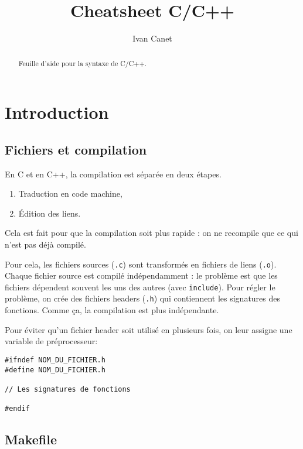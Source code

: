 \documentclass[10pt,a4paper,french]{article}
\begin{document}
\title{Cheatsheet C/C++}
\author{Ivan Canet}
\maketitle

\begin{abstract} %
Feuille d'aide pour la syntaxe de C/C++.
\end{abstract}

\tableofcontents

\section{Introduction}

\subsection{Fichiers et compilation}

En C et en C++, la compilation est séparée en deux étapes.
\begin{enumerate}
\item Traduction en code machine,
\item Édition des liens.
\end{enumerate}

Cela est fait pour que la compilation soit plus rapide : on ne recompile que ce qui n'est pas déjà compilé.

Pour cela, les fichiers sources ({\tt .c}) sont transformés en fichiers de liens ({\tt .o}). Chaque fichier source est compilé indépendamment : le problème est que les fichiers dépendent souvent les uns des autres (avec {\tt include}). Pour régler le problème, on crée des fichiers headers ({\tt .h}) qui contiennent les signatures des fonctions. Comme ça, la compilation est plus indépendante.

Pour éviter qu'un fichier header soit utilisé en plusieurs fois, on leur assigne une variable de préprocesseur:

\begin{verbatim}
#ifndef NOM_DU_FICHIER.h
#define NOM_DU_FICHIER.h

// Les signatures de fonctions

#endif
\end{verbatim}

\subsection{Makefile}
\end{document}
